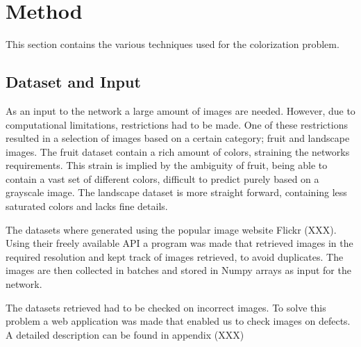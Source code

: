 \section{Method}
%
%
%
%

This section contains the various techniques used for the colorization problem.
\subsection{Dataset and Input}

As an input to the network a large amount of images are needed.
However, due to computational limitations, restrictions had to be made.
One of these restrictions resulted in a selection of images based on a certain category; fruit and landscape images.
The fruit dataset contain a rich amount of colors, straining the networks requirements.
This strain is implied by the ambiguity of fruit, being able to contain a vast set of different colors, difficult to predict purely based on a grayscale image.
The landscape dataset is more straight forward, containing less saturated colors and lacks fine details.

The datasets where generated using the popular image website {\color{red} Flickr (XXX)}.
Using their freely available API a program was made that retrieved images in the required resolution and kept track of images retrieved, to avoid duplicates.
The images are then collected in batches and stored in Numpy arrays as input for the network.

The datasets retrieved had to be checked on incorrect images. To solve this problem a web application was made that enabled us to check images on defects. A detailed description can be found in {\color{red}appendix (XXX)}

